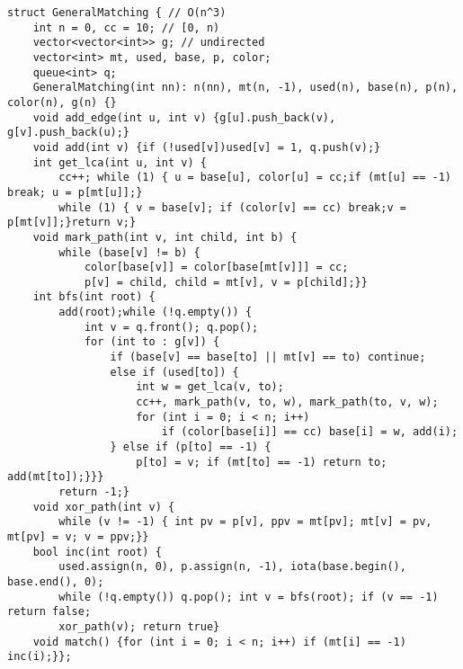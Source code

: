 \documentclass[12pt]{article}
\begin{document}
\begin{verbatim}
struct GeneralMatching { // O(n^3)
    int n = 0, cc = 10; // [0, n)
    vector<vector<int>> g; // undirected
    vector<int> mt, used, base, p, color;
    queue<int> q;
    GeneralMatching(int nn): n(nn), mt(n, -1), used(n), base(n), p(n), color(n), g(n) {}
    void add_edge(int u, int v) {g[u].push_back(v), g[v].push_back(u);}
    void add(int v) {if (!used[v])used[v] = 1, q.push(v);}
    int get_lca(int u, int v) {
        cc++; while (1) { u = base[u], color[u] = cc;if (mt[u] == -1) break; u = p[mt[u]];}
        while (1) { v = base[v]; if (color[v] == cc) break;v = p[mt[v]];}return v;}
    void mark_path(int v, int child, int b) {
        while (base[v] != b) {
            color[base[v]] = color[base[mt[v]]] = cc;
            p[v] = child, child = mt[v], v = p[child];}}
    int bfs(int root) {
        add(root);while (!q.empty()) {
            int v = q.front(); q.pop();
            for (int to : g[v]) {
                if (base[v] == base[to] || mt[v] == to) continue;
                else if (used[to]) {
                    int w = get_lca(v, to);
                    cc++, mark_path(v, to, w), mark_path(to, v, w);
                    for (int i = 0; i < n; i++) 
                        if (color[base[i]] == cc) base[i] = w, add(i);
                } else if (p[to] == -1) { 
                    p[to] = v; if (mt[to] == -1) return to; add(mt[to]);}}}
        return -1;}
    void xor_path(int v) {
        while (v != -1) { int pv = p[v], ppv = mt[pv]; mt[v] = pv, mt[pv] = v; v = ppv;}}
    bool inc(int root) {
        used.assign(n, 0), p.assign(n, -1), iota(base.begin(), base.end(), 0);
        while (!q.empty()) q.pop(); int v = bfs(root); if (v == -1) return false;
        xor_path(v); return true}
    void match() {for (int i = 0; i < n; i++) if (mt[i] == -1) inc(i);}};
\end{verbatim}
\end{document}
